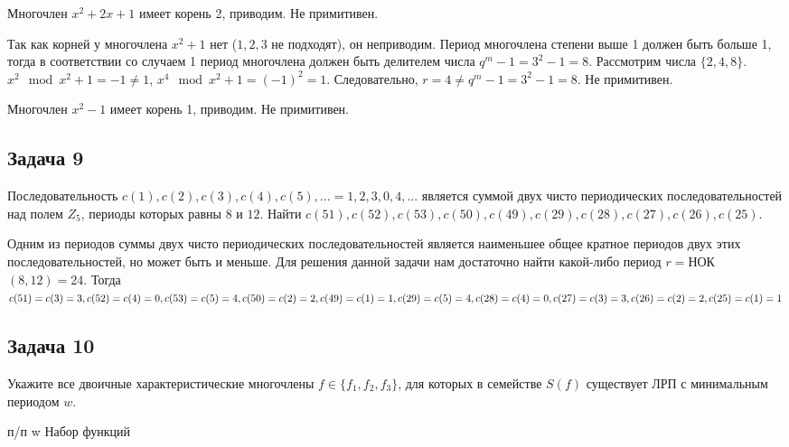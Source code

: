 \documentclass[utf8x, 14pt]{G7-32} %
\begin{document}
\begin{enumerate}
     Многочлен $ x^2+2x+1$ имеет корень 2, приводим. Не примитивен.
     
     Так как корней у многочлена $x^2+1$ нет ($1,2,3$ не подходят), он неприводим. Период многочлена степени выше 1 должен быть больше 1, тогда в соответствии со случаем 1 период многочлена должен быть делителем числа $q^m -1 = 3^2 -1 = 8$. Рассмотрим числа $\{2, 4, 8\}$. $x^2 \mod x^2 + 1 = -1 \neq 1$,  $x^4 \mod x^2 + 1 = (-1)^2 = 1$. Следовательно, $r=4\neq q^m -1 = 3^2 -1 = 8$. Не примитивен.
     
      Многочлен $ x^2-1$ имеет корень 1, приводим. Не примитивен.
     
\end{enumerate}

\subsection{Задача 9}

Последовательность $c(1),c(2),c(3),c(4),c(5), ... = 1,2,3,0,4,...$ является суммой двух чисто периодических последовательностей над полем $Z_5$, периоды которых равны $8$ и $12$. Найти $c(51), c(52), c(53), c(50), c(49), c(29), c(28), c(27), c(26), c(25)$.

Одним из периодов суммы двух чисто периодических последовательностей является наименьшее общее кратное периодов двух этих последовательностей, но может быть и меньше. Для решения данной задачи нам достаточно найти какой-либо период $r = $НОК$(8, 12) = 24$.
Тогда $c(51)=c(3)=3, c(52)=c(4)=0, c(53)=c(5)=4, c(50)=c(2)=2, c(49)=c(1)=1, c(29)=c(5)=4,\\ c(28)=c(4)=0, c(27)=c(3)=3, c(26)=c(2)=2, c(25)=c(1)=1$

\subsection{Задача 10}

Укажите все двоичные характеристические многочлены $f\in\{f_1, f_2, f_3\}$, для которых в семействе $S(f)$ существует ЛРП с минимальным периодом $w$.

п/п w Набор функций
\end{document}
